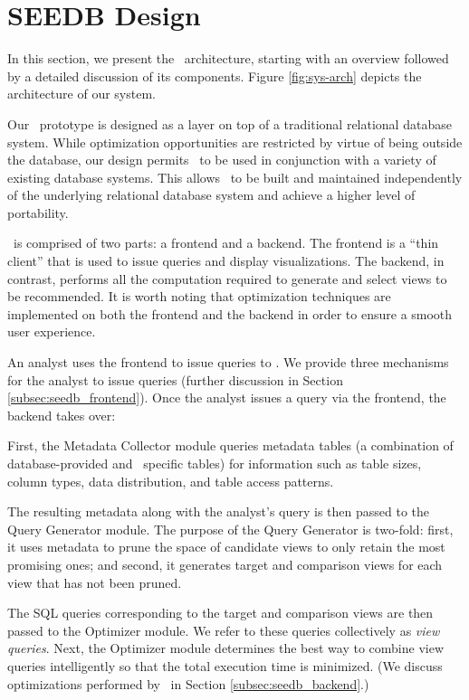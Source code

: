 \section{SEEDB Design}
\label{sec:system_architecture}

In this section, we present the \SeeDB\ architecture, starting with an
overview followed by a detailed discussion of its components. Figure \ref{fig:sys-arch}
depicts the architecture of our system.


Our \SeeDB\ prototype is designed as a layer on top of a traditional
relational database system. 
While optimization opportunities are restricted by virtue of being outside the
database, our design permits \SeeDB\ to be used in conjunction with a variety of
existing database systems. This allows \SeeDB\ to be built and maintained independently of the underlying relational database system and achieve a higher level of portability.


\SeeDB\ is comprised of two parts: a frontend and a backend. 
The frontend is a ``thin client'' that
is used to issue queries and display visualizations. The backend, in
contrast, performs all the computation required to generate and select views
to be recommended. It is worth noting that optimization techniques are implemented on both the frontend and the backend in order to ensure a smooth user experience.


An analyst uses the frontend to issue queries to \SeeDB. We provide three
mechanisms for the analyst to issue queries (further discussion in
Section \ref{subsec:seedb_frontend}).
Once the analyst issues a query via the frontend, the backend takes over:

First, the Metadata Collector module queries metadata tables (a combination of
database-provided and \SeeDB\ specific tables) for information such as table
sizes, column types, data distribution, and table access patterns.


The resulting metadata along with the analyst's query is then passed to the
Query Generator module. The purpose of the Query Generator is two-fold:
first, it uses metadata to prune the space of candidate views to only retain the
most promising ones; and second, it generates target and comparison views for
each view that has not been pruned.


The SQL queries corresponding to the target and comparison views are then passed
to the Optimizer module. We refer to these queries collectively as {\it view
queries}. Next, the Optimizer module determines the best way to
combine view queries intelligently so that the total execution time is
minimized.
(We discuss optimizations performed by \SeeDB\ in Section
\ref{subsec:seedb_backend}.) 

